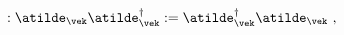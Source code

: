 \begin{equation}
    :\atilde_{\vek}\atilde^\dagger_{\vek}: = \atilde^\dagger_{\vek}
    \atilde_{\vek} \ ,
\end{equation}


